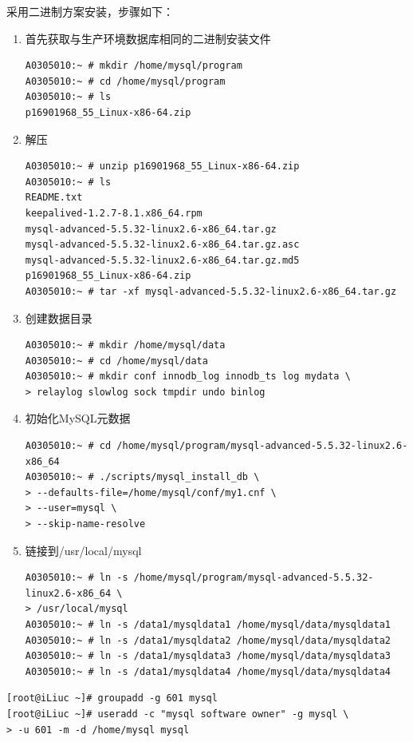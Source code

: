 采用二进制方案安装，步骤如下：
\begin{enumerate}[itemsep=0pt,parsep=0pt]
\item 首先获取与生产环境数据库相同的二进制安装文件
\begin{verbatim}
A0305010:~ # mkdir /home/mysql/program
A0305010:~ # cd /home/mysql/program
A0305010:~ # ls
p16901968_55_Linux-x86-64.zip
\end{verbatim}
\item 解压
\begin{verbatim}
A0305010:~ # unzip p16901968_55_Linux-x86-64.zip
A0305010:~ # ls
README.txt
keepalived-1.2.7-8.1.x86_64.rpm
mysql-advanced-5.5.32-linux2.6-x86_64.tar.gz
mysql-advanced-5.5.32-linux2.6-x86_64.tar.gz.asc
mysql-advanced-5.5.32-linux2.6-x86_64.tar.gz.md5
p16901968_55_Linux-x86-64.zip
A0305010:~ # tar -xf mysql-advanced-5.5.32-linux2.6-x86_64.tar.gz
\end{verbatim}
\item 创建数据目录
\begin{verbatim}
A0305010:~ # mkdir /home/mysql/data
A0305010:~ # cd /home/mysql/data
A0305010:~ # mkdir conf innodb_log innodb_ts log mydata \
> relaylog slowlog sock tmpdir undo binlog
\end{verbatim}
\item 初始化MySQL元数据
\begin{verbatim}
A0305010:~ # cd /home/mysql/program/mysql-advanced-5.5.32-linux2.6-x86_64
A0305010:~ # ./scripts/mysql_install_db \
> --defaults-file=/home/mysql/conf/my1.cnf \
> --user=mysql \
> --skip-name-resolve
\end{verbatim}
\item 链接到/usr/local/mysql
\begin{verbatim}
A0305010:~ # ln -s /home/mysql/program/mysql-advanced-5.5.32-linux2.6-x86_64 \
> /usr/local/mysql
A0305010:~ # ln -s /data1/mysqldata1 /home/mysql/data/mysqldata1
A0305010:~ # ln -s /data1/mysqldata2 /home/mysql/data/mysqldata2
A0305010:~ # ln -s /data1/mysqldata3 /home/mysql/data/mysqldata3
A0305010:~ # ln -s /data1/mysqldata4 /home/mysql/data/mysqldata4
\end{verbatim}
\end{enumerate}

\small{
\begin{verbatim}
[root@iLiuc ~]# groupadd -g 601 mysql
[root@iLiuc ~]# useradd -c "mysql software owner" -g mysql \
> -u 601 -m -d /home/mysql mysql
\end{verbatim}
}
\normalsize

